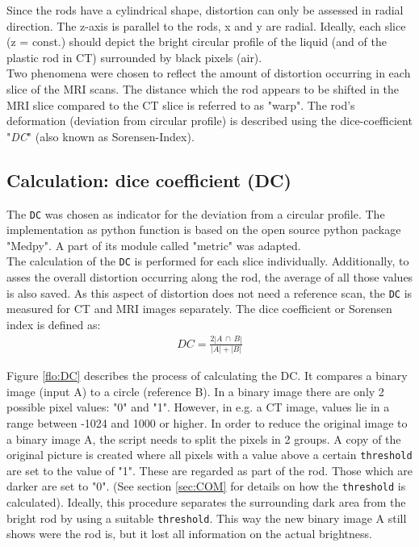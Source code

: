Since the rods have a cylindrical shape, distortion can only be assessed in radial direction.
The z-axis is parallel to the rods, x and y are radial.
Ideally, each slice (z = const.) should depict the bright circular profile of the liquid (and of the plastic rod in CT) surrounded by black pixels (air).
\\
Two phenomena were chosen to reflect the amount of distortion occurring in each slice of the MRI scans.
The distance which the rod appears to be shifted in the MRI slice compared to the CT slice is referred to as "warp".
The rod's deformation (deviation from circular profile) is described using the dice-coefficient "\textit{DC}" (also known as Sorensen-Index).


\subsection{Calculation: dice coefficient (DC)}
\label{sec:DC}

The \texttt{DC} was chosen as indicator for the deviation from a circular profile.
The implementation as python function is based on the open source python package "Medpy". \cite{MedPy} A part of its module called "metric" was adapted. \cite{MedPy_dc-code}\\


The calculation of the \texttt{DC} is performed for each slice individually.
Additionally, to asses the overall distortion occurring along the rod, the average of all those values is also saved.
As this aspect of distortion does not need a reference scan, the \texttt{DC} is measured for CT and MRI images separately.
The dice coefficient or Sorensen index \cite{MedPy_dc-doc} is defined as:
\begin{align}
\label{eq:DC}
DC = \frac{2 |A \, \cap \, B|}{|A| + |B|}
\end{align}

Figure \ref{flo:DC} describes the process of calculating the DC.
It compares a binary image (input A) to a circle (reference B).
In a binary image there are only 2 possible pixel values: "0" and "1".
However, in e.g. a CT image, values lie in a range between -1024 and 1000 or higher.
In order to reduce the original image to a binary image A, the script needs to split the pixels in 2 groups.
A copy of the original picture is created where all pixels with a value above a certain  \texttt{threshold} are set to the value of "1".
These are regarded as part of the rod.
Those which are darker are set to "0".
(See section \ref{sec:COM} for details on how the \texttt{threshold} is calculated).
Ideally, this procedure separates the surrounding dark area from the bright rod by using a suitable \texttt{threshold}.
This way the new binary image A still shows were the rod is, but it lost all information on the actual brightness.

